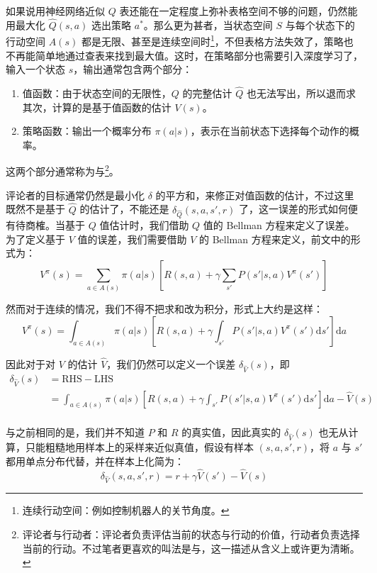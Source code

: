 如果说用神经网络近似 $Q$ 表还能在一定程度上弥补表格空间不够的问题，仍然能用最大化 $\hat Q(s, a)$ 选出策略 $a^*$。那么更为甚者，当状态空间 $S$ 与每个状态下的行动空间 $A(s)$ 都是无限、甚至是连续空间时\footnote{连续行动空间：例如控制机器人的关节角度。}，不但表格方法失效了，策略也不再能简单地通过查表来找到最大值。这时，在策略部分也需要引入深度学习了，输入一个状态 $s$，输出通常包含两个部分：
\begin{enumerate}
    \item 值函数：由于状态空间的无限性，$Q$ 的完整估计 $\hat Q$ 也无法写出，所以退而求其次，计算的是基于值函数的估计 $V(s)$。
    \item 策略函数：输出一个概率分布 $\pi(a | s)$，表示在当前状态下选择每个动作的概率。
\end{enumerate}

这两个部分通常称为与\footnote{评论者与行动者：评论者负责评估当前的状态与行动的价值，行动者负责选择当前的行动。不过笔者更喜欢的叫法是与，这一描述从含义上或许更为清晰。}。

评论者的目标通常仍然是最小化 $\delta$ 的平方和，来修正对值函数的估计，不过这里既然不是基于 $\hat Q$ 的估计了，不能还是 $\delta_{\hat Q} (s, a, s', r)$ 了，这一误差的形式如何便有待商榷。当基于 $Q$ 值估计时，我们借助 $Q$ 值的 Bellman 方程来定义了误差。为了定义基于 $V$ 值的误差，我们需要借助 $V$ 的 Bellman 方程来定义，前文中的形式为：
\[
    V^\pi (s) = \sum_{a \in A(s)} \pi(a | s) \left[ R(s, a) + \gamma \sum_{s'} P(s' | s, a) V^\pi (s')\right]
\]

然而对于连续的情况，我们不得不把求和改为积分，形式上大约是这样：
\[
    V^\pi (s) = \int_{a \in A(s)} \pi(a | s) \left[ R(s, a) + \gamma \int_{s'} P(s' | s, a) V^\pi (s')\mathrm{d}s'\right] \mathrm{d}a
\]

因此对于对 $V$ 的估计 $\hat V$，我们仍然可以定义一个误差 $\delta_{\hat V} (s)$，即
\[
\begin{aligned}
    \delta_{\hat V} (s) &= \text{RHS} - \text{LHS} \\
    &= \int_{a \in A(s)} \pi(a | s) \left[ R(s, a) + \gamma \int_{s'} P(s' | s, a) V^\pi (s')\mathrm{d}s'\right] \mathrm{d}a - \hat V (s) \\
\end{aligned}
\]

与之前相同的是，我们并不知道 $P$ 和 $R$ 的真实值，因此真实的 $\delta_{\hat V} (s)$ 也无从计算，只能粗糙地用样本上的采样来近似真值，假设有样本 $(s, a, s', r)$，将 $a$ 与 $s'$ 都用单点分布代替，并在样本上化简为：
\[
    \delta_{\hat V} (s, a, s', r) = r + \gamma \hat V (s') - \hat V (s)
\]


